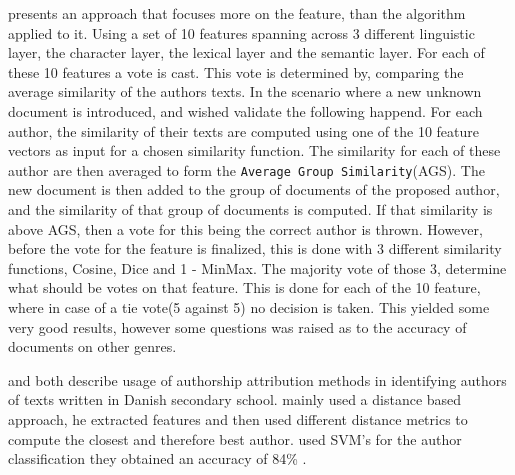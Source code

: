 \cite{castro2015} presents an approach that focuses more on the feature, than 
the algorithm applied to it. Using a set of 10 features spanning across 3 
different linguistic layer, the character layer, the lexical layer and the 
semantic layer. For each of these 10 features a vote is cast.
This vote is determined by, comparing the average similarity of the authors 
texts. In the scenario where a new unknown document is introduced, and wished 
validate the following happend.
For each author, the similarity of their texts are computed using one of the 10 
feature vectors as input for a chosen similarity function. The similarity for 
each of these author are then averaged to form the \texttt{Average Group 
Similarity}(AGS). The new document is then added to the group of documents of 
the proposed author, and the similarity of that group of documents is computed. 
If that similarity is above AGS, then a vote for this being the correct author 
is thrown.
However, before the vote for the feature is finalized, this is done with 3 
different similarity functions, Cosine, Dice and 1 - MinMax. The majority vote 
of those 3, determine what should be votes on that feature. This is done for 
each of the 10 feature, where in case of a tie vote(5 against 5) no decision is 
taken. This yielded some very good results, however some questions was raised 
as to the accuracy of documents on other genres.



\cite{hansen2014} and \cite{aalykke2016} both describe usage of authorship
attribution methods in identifying authors of texts written in Danish secondary
school. \cite{aalykke2016} mainly used a distance based approach, he extracted
features and then used different distance metrics to compute the closest and
therefore best author. \cite{hansen2014} used SVM's for the author
classification they obtained an accuracy of 84\% .
